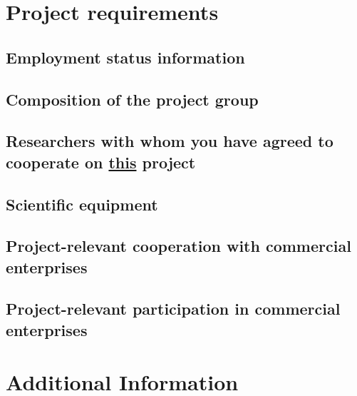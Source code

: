 \documentclass{scrartcl}
\begin{document}
\section{Project requirements}

\subsection{Employment status information}

\subsection{Composition of the project group}

\subsection{Researchers with whom you have agreed to cooperate on \underline{this} project}

\subsection{Scientific equipment}

\subsection{Project-relevant cooperation with commercial enterprises}

\subsection{Project-relevant participation in commercial enterprises}


\section{Additional Information}
\end{document}

